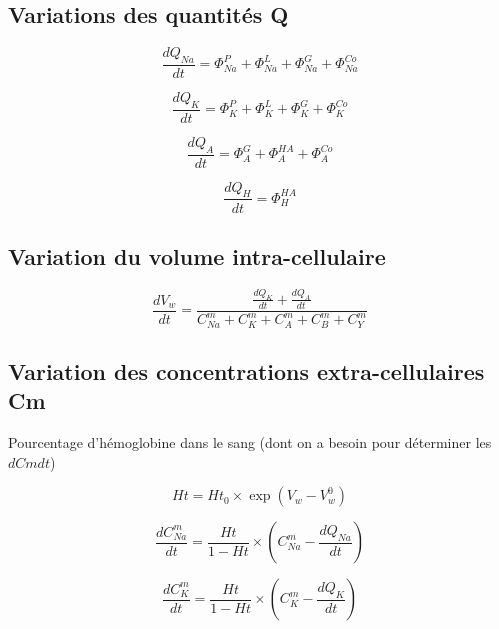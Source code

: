 \documentclass[a4paper,fleqn]{article}
\begin{document}
\subsection{Variations des quantités Q}

\begin{equation}
\frac{dQ_{Na}}{dt}=\Phi_{Na}^{P}+\Phi_{Na}^{L}+\Phi_{Na}^{G}+\Phi_{Na}^{Co}
\end{equation}

\begin{equation}
\frac{dQ_K}{dt}=\Phi_{K}^{P}+\Phi_{K}^{L}+\Phi_{K}^{G}+\Phi_{K}^{Co}
\end{equation}

\begin{equation}
\frac{dQ_A}{dt}=\Phi_{A}^{G}+\Phi_{A}^{HA}+\Phi_{A}^{Co}
\end{equation}

\begin{equation}
\frac{dQ_H}{dt}=\Phi_{H}^{HA}
\end{equation}

\subsection{Variation du volume intra-cellulaire}

\begin{equation}
\frac{dV_w}{dt}   = \frac{\frac{dQ_K}{dt}+\frac{dQ_A}{dt}}{C_{Na}^{m}+C_{K}^{m}+C_{A}^{m}+C_{B}^{m}+C_{Y}^{m}}
\end{equation}

\subsection{Variation des concentrations extra-cellulaires Cm}

Pourcentage d'hémoglobine dans le sang (dont on a besoin pour déterminer les $dCmdt$)

\begin{equation}
Ht = {Ht_0}\times{\exp{(V_w-V_w^0)}}
\end{equation}

\begin{equation}
\frac{dC_{Na}^m}{dt}={\frac{Ht}{1 - Ht}}\times{\left(C_{Na}^m-\frac{dQ_{Na}}{dt}\right)}
\end{equation}

\begin{equation}
\frac{dC_{K}^m}{dt}={\frac{Ht}{1 - Ht}}\times{\left(C_{K}^m-\frac{dQ_{K}}{dt}\right)}
\end{equation}
\end{document}

